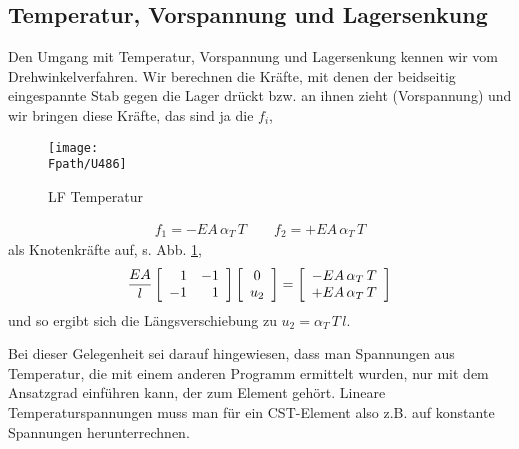 {\textcolor{sectionTitleBlue}{\section{Temperatur, Vorspannung und Lagersenkung}}}\label{Temperatur und Lagersenkung}
Den Umgang mit Temperatur, Vorspannung und Lagersenkung kennen wir vom Drehwinkelverfahren. Wir berechnen die Kr\"{a}fte, mit denen der beidseitig eingespannte Stab gegen die Lager dr\"{u}ckt bzw. an ihnen zieht (Vorspannung) und wir bringen diese Kr\"{a}fte, das sind ja die $f_i$,
\begin{figure}[tbp] \centering
\if {} \sidecaption \fi
\texttt{[image: \\Fpath/U486]}
\caption{LF Temperatur} \label{Temperatur}
\end{figure}%
\begin{align}
f_1 = - EA\,\alpha_T\,T \qquad f_2 = + EA\,\alpha_T\,T
\end{align}
als Knotenkr\"{a}fte auf, s. Abb. \ref{Temperatur},
\begin{align}
\frac{EA}{l}\left[\barr{r r} 1 & - 1 \\ - 1 & 1 \earr\right]\left[\barr{c} 0 \\u_2 \earr \right] = \left[\barr{c} - EA\,\alpha_T\,T \\ + EA\,\alpha_T\,T \earr \right]
\end{align}
und so ergibt sich die L\"{a}ngsverschiebung zu $u_2 = \alpha_T\,T\,l$.

Bei dieser Gelegenheit sei darauf hingewiesen, dass man Spannungen aus Temperatur, die
mit einem anderen Programm ermittelt wurden, nur mit dem Ansatzgrad einf\"{u}hren kann, der
zum Element geh\"{o}rt. Lineare Temperaturspannungen muss man f\"{u}r ein CST-Element also z.B.
auf konstante Spannungen herunterrechnen.

